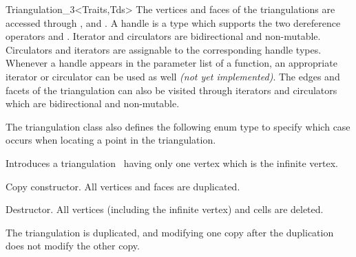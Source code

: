 \begin{ccClassTemplate}{Triangulation_3<Traits,Tds>}
The vertices and faces of the triangulations are accessed through
,  and . 
A handle is a type which supports the two dereference operators
 and . Iterator and circulators are
bidirectional and non-mutable.  Circulators and iterators are
assignable to the corresponding handle types. Whenever a handle appears 
in the parameter list of a function, an appropriate iterator or
circulator can be used as well \textit{(not yet implemented)}.  The
edges and facets of the 
triangulation can also be visited through iterators and circulators
which are bidirectional and non-mutable.

\ccGlue
{}

\ccGlue
{}
\ccGlue
{}
\ccGlue
{}

\ccGlue
{}

The triangulation class also defines the following enum type to specify
which case occurs when locating a point in the triangulation. 

{}

\ccCreation
{}

{Introduces a triangulation \ccVar\ having only one vertex which is the
infinite vertex.} 

{Copy constructor. All vertices and faces are duplicated.}

{Destructor. All vertices (including the infinite vertex) and cells are
deleted.}


{The triangulation  is duplicated, and modifying one copy after the 
duplication does not modify the other copy.}


\end{ccClassTemplate}
